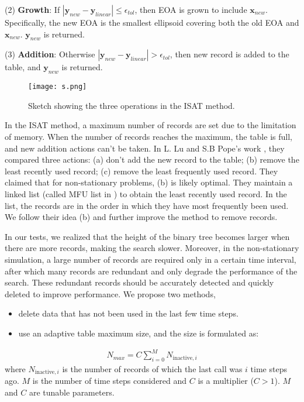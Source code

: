 (2) \textbf{Growth}: If $\left|\mathbf{y}_{new}- \mathbf{y}_{linear}\right|\leq\epsilon_{tol}$, then EOA is grown to include $\mathbf{x}_{new}$. Specifically, the new EOA is the smallest ellipsoid covering both the old EOA and $\mathbf{x}_{new}$. $\mathbf{y}_{new}$ is returned.

(3) \textbf{Addition}: Otherwise $\left|\mathbf{y}_{new}- \mathbf{y}_{linear}\right|>\epsilon_{tol}$, then new record is added to the table, and $\mathbf{y}_{new}$ is returned.

\begin{figure}[htbp]
\centering
\texttt{[image: s.png]}
\caption{Sketch showing the three operations in the ISAT method.}
\label{ISAT_ALG} 
\end{figure}

In the ISAT method, a maximum number of records are set due to the limitation of memory. When the number of records reaches the maximum, the table is full, and new addition actions can't be taken. In L. Lu and S.B Pope's work \cite{lu2009improved}, they compared three actions: (a) don't add the new record to the table; (b) remove the least recently used record; (c) remove the least frequently used record. They claimed that for non-stationary problems, (b) is likely optimal. They maintain a linked list (called MFU list in \cite{lu2009improved}) to obtain the least recently used record. In the list, the records are in the order in which they have most frequently been used. We follow their idea (b) and further improve the method to remove records.

In our tests, we realized that the height of the binary tree becomes larger when there are more records, making the search slower. Moreover, in the non-stationary simulation, a large number of records are required only in a certain time interval, after which many records are redundant and only degrade the performance of the search. These redundant records should be accurately detected and quickly deleted to improve performance. We propose two methods, 
\begin{itemize}
\item delete data that has not been used in the last few time steps. 
\item use an adaptive table maximum size, and the size is formulated as:
\end{itemize}
\begin{align}
N_{max} = C \sum_{i=0}^M  N_{\text{inactive},i}  \label{eq:adap}
\end{align}
where $ N_{\text{inactive},i}$ is the number of records of which the last call was $i$ time steps ago. $M$ is the number of time steps considered and $C$ is a multiplier ($C>1$). $M$ and $C$ are tunable parameters.


